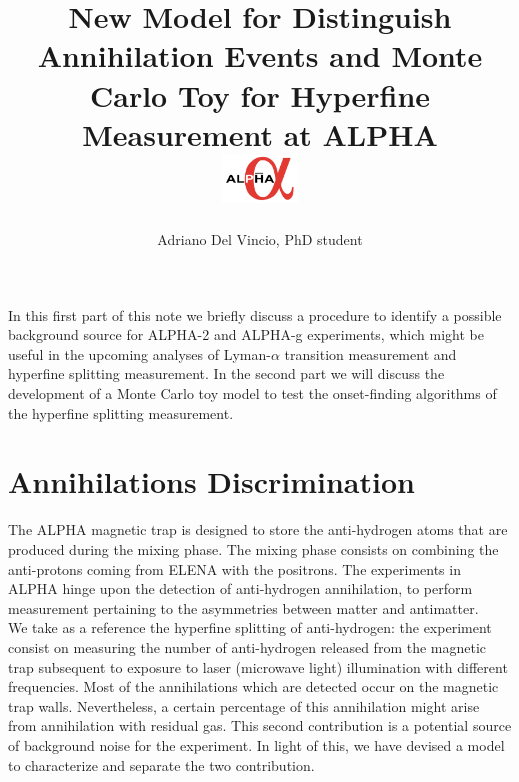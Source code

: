 \documentclass[11pt,a4paper,twocolumn]{article}
\title{%
 \vspace{-4.0cm}
 New Model for Distinguish Annihilation Events and Monte Carlo Toy for Hyperfine Measurement at ALPHA\\
 \vspace{0.5cm}
 \includegraphics[width = 0.15\textwidth]{../../logo/ALPHA_Logo.jpg}
}
\date{\vspace{-5ex}}
\author{Adriano Del Vincio, PhD student}
\begin{document}

In this first part of this note we briefly discuss a procedure to identify a possible background source for ALPHA-2 and ALPHA-g experiments, which might be useful in the upcoming analyses of Lyman-$\alpha$ transition measurement and hyperfine splitting measurement. In the second part we will discuss the development of a Monte Carlo toy model to test the onset-finding algorithms of the hyperfine splitting measurement.  

\section*{Annihilations Discrimination}

The ALPHA magnetic trap is designed to store the anti-hydrogen atoms that are produced during the mixing phase. The mixing phase consists on combining the anti-protons coming from ELENA with the positrons. 
The experiments in ALPHA hinge upon the detection of anti-hydrogen annihilation, to perform measurement pertaining to the asymmetries between matter and antimatter.\\
We take as a reference the hyperfine splitting of anti-hydrogen: the experiment consist on measuring the number of anti-hydrogen released from the magnetic trap subsequent to exposure to laser (microwave light) illumination with different frequencies. Most of the annihilations which are detected occur on the magnetic trap walls. Nevertheless, a certain percentage of this annihilation might arise from annihilation with residual gas. This second contribution is a potential source of background noise for the experiment. In light of this, we have devised a model to characterize and separate the two contribution.
\end{document}
